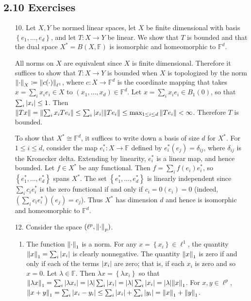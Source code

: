 \documentclass[11pt,leqno]{article}
\theoremstyle{plain}
\theoremstyle{definition}
\numberwithin{equation}{section}
\numberwithin{lem}{section}
\newcommand{\cbr}[1]{\left\{#1\right\}}
\begin{document}
\subsection*{2.10 Exercises}
\begin{enumerate}
  \item[10.] Let $X,Y$ be normed linear spaces, let $X$ be finite dimensional with basis $\cbr{e_1,\dots,e_d}$, and let $T\colon X\to Y$ be linear. We show that $T$ is bounded and that the dual space $X^\ast = B(X,\mathbb F)$ is isomorphic and homeomorphic to $\mathbb F^d$.
  
  All norms on $X$ are equivalent since $X$ is finite dimensional. Therefore it suffices to show that $T\colon X\to Y$ is bounded when $X$ is topologized by the norm $\norm{\cdot}_X\coloneqq \norm{c(\cdot)}_{\ell^1}$, where $c\colon X\to \mathbb F^d$ is the coordinate mapping that takes $x = \sum_ix_ie_i\in X$ to $(x_1,\dots,x_d)\in \mathbb F^d$. Let $x = \sum_i x_ie_i\in B_1(0)$, so that $\sum_i \abs{x_i} \leq 1$. Then $\norm{Tx} = \norm{\sum_i x_iTe_i}\leq \sum_i \abs{x_i} \norm{Te_i}\leq \max_{1\leq i\leq d}\norm{Te_i}< \infty$. Therefore $T$ is bounded.

  To show that $X^\ast\cong \mathbb F^d$, it suffices to write down a basis of size $d$ for $X^\ast$. For $1\leq i\leq d$, consider the map $e_i^\ast\colon X\to \mathbb F$ defined by $e_i^\ast(e_j) = \delta_{ij}$, where $\delta_{ij}$ is the Kronecker delta. Extending by linearity, $e_i^\ast$ is a linear map, and hence bounded. Let $f\in X^\ast$ be any functional. Then $f = \sum_i f(e_i)e_i^\ast$, so $\cbr{e_1^\ast,\dots,e_d^\ast}$ spans $X^\ast$. The set $\cbr{e_1^\ast,\dots,e_d^\ast}$ is linearly independent since $\sum_i c_ie_i^\ast$ is the zero functional if and only if $c_i = 0(e_i) = 0$ (indeed, $(\sum_i c_ie_i^\ast)(e_j) = c_j$). Thus $X^\ast$ has dimension $d$ and hence is isomorphic and homeomorphic to $\mathbb F^d$.
  
  \item[12.] Consider the space $(\ell^p, \norm{\cdot}_p)$.
  \begin{enumerate}
    \item The function $\norm{\cdot}_1$ is a norm. For any $x = \cbr{x_i}\in \ell^1$, the quantity $\norm{x}_1 = \sum_i \abs{x_i}$ is clearly nonnegative. The quantity $\norm{x}_1$ is zero if and only if each of the terms $\abs{x_i}$ are zero; that is, if each $x_i$ is zero and so $x = 0$. Let $\lambda\in \mathbb F$. Then $\lambda x = \cbr{\lambda x_i}$ so that $\norm{\lambda x}_1 = \sum_i \abs{\lambda x_i} = \abs{\lambda}\sum_i \abs{x_i} = \abs{\lambda}\sum_i \abs{x_i} = \abs{\lambda}\norm{x}_1$. For $x,y\in \ell^p$, $\norm{x+y}_1 = \sum_i\abs{x_i-y_i}\leq \sum_i \abs{x_i} + \sum_i\abs{y_i} = \norm{x}_1 + \norm{y}_1$.
    

\end{enumerate}
\end{enumerate}
\end{document}
